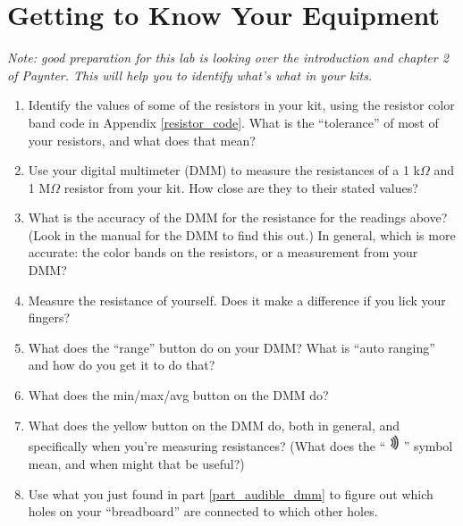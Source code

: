 \section{Getting to Know Your Equipment}
\label{lab_equipment}


\bigskip

\textit{Note: good preparation for this lab is looking over the introduction and chapter 2 of Paynter.  This will help you to identify what's what in your kits.}

\begin{enumerate}[wide]

\item Identify the values of some of the resistors in your kit, using the resistor color band code 
in Appendix \ref{resistor_code}.
What is the ``tolerance'' of most of your resistors, and what does that mean?   

\item Use your digital multimeter (DMM) to measure the resistances of a 1 k$\Omega$ and 1 M$\Omega$ resistor from your kit.  How close are they to their stated values?

\item What is the accuracy of the DMM for the resistance for the readings above?  (Look in the manual for the DMM to find this out.)  In general, which is more accurate: the color bands on the resistors, or a measurement from your DMM?

\item Measure the resistance of yourself.  Does it make a difference if you lick your fingers?  

\item What does the ``range'' button do on your DMM?  What is ``auto ranging'' and how do you get it to do that?

\item What does the min/max/avg button on the DMM do?

\item What does the yellow button on the DMM do, both in general, and specifically when you're measuring resistances?  (What does the ``
\includegraphics[height=0.2in]{equipment/sound.pdf}
'' symbol mean, and when might that be useful?) \label{part_audible_dmm}

\item Use what you just found in part \ref{part_audible_dmm} to figure out which holes on your ``breadboard'' are connected to which other holes.   


\end{enumerate}

